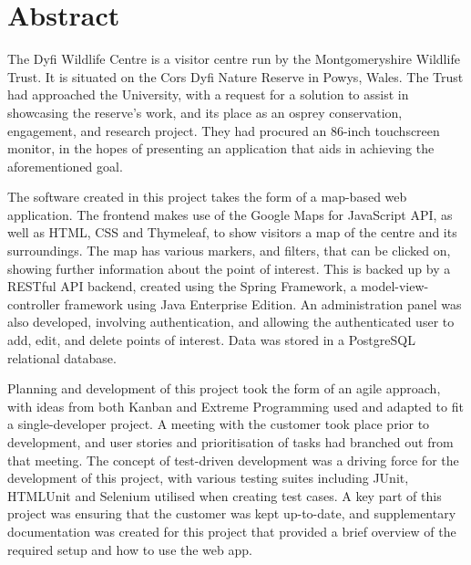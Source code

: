 \thispagestyle{empty}


\section*{\centering Abstract}

The Dyfi Wildlife Centre is a visitor centre run by the Montgomeryshire Wildlife Trust. It is situated on the Cors Dyfi Nature Reserve in Powys, Wales. The Trust had approached the University, with a request for a solution to assist in showcasing the reserve's work, and its place as an osprey conservation, engagement, and research project. They had procured an 86-inch touchscreen monitor, in the hopes of presenting an application that aids in achieving the aforementioned goal.

The software created in this project takes the form of a map-based web application. The frontend makes use of the Google Maps for JavaScript API, as well as HTML, CSS and Thymeleaf, to show visitors a map of the centre and its surroundings. The map has various markers, and filters, that can be clicked on, showing further information about the point of interest. This is backed up by a RESTful API backend, created using the Spring Framework, a model-view-controller framework using Java Enterprise Edition. An administration panel was also developed, involving authentication, and allowing the authenticated user to add, edit, and delete points of interest. Data was stored in a PostgreSQL relational database.

Planning and development of this project took the form of an agile approach, with ideas from both Kanban and Extreme Programming used and adapted to fit a single-developer project. A meeting with the customer took place prior to development, and user stories and prioritisation of tasks had branched out from that meeting. The concept of test-driven development was a driving force for the development of this project, with various testing suites including JUnit, HTMLUnit and Selenium utilised when creating test cases. A key part of this project was ensuring that the customer was kept up-to-date, and supplementary documentation was created for this project that provided a brief overview of the required setup and how to use the web app.



